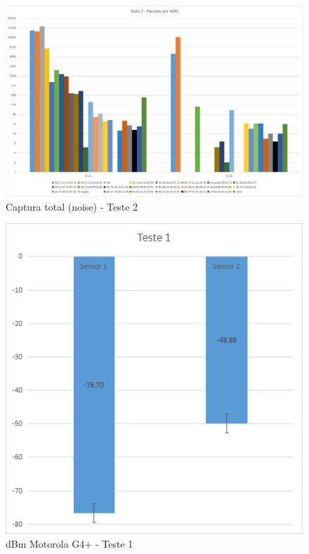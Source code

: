 \begin{figure}[htb]
	\caption{\label{fig-modulos-esp}Captura total (noise) - Teste 2}
	\begin{center}
		\includegraphics[width=1\textwidth]{060-testes/data-analisis/distance-mg4plus-netflix/Teste2.png}
	\end{center}
\end{figure}


\begin{figure}[htb]
	\caption{\label{fig-modulos-esp}dBm Motorola G4+ - Teste 1}
	\begin{center}
		\includegraphics[width=1\textwidth]{060-testes/data-analisis/distance-mg4plus-netflix/target-Teste1.png}
	\end{center}
\end{figure}

